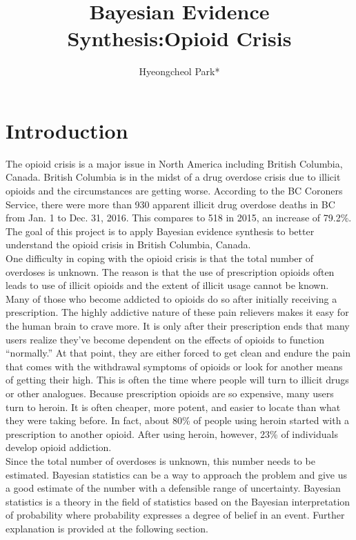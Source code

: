 \documentclass[12pt]{article}
\title{Bayesian Evidence Synthesis:Opioid Crisis}
\author{Hyeongcheol Park*}
\begin{document}
 \maketitle{}
\tableofcontents %
\listoffigures %
\listoftables %
\doublespacing

\section{Introduction}
The opioid crisis is a major issue in North America including British Columbia, Canada. British Columbia is in the midst of a drug overdose crisis due to illicit opioids and the circumstances are getting worse. According to the BC Coroners Service, there were more than 930 apparent illicit drug overdose deaths in BC from Jan. 1 to Dec. 31, 2016. This compares to 518 in 2015, an increase of 79.2\%. \cite{bccdc_opioid}  The goal of this project is to apply Bayesian evidence synthesis to better understand the opioid crisis in British Columbia, Canada.  \\ 

One difficulty in coping with the opioid crisis is that the total number of overdoses is unknown. The reason is that the use of prescription opioids often leads to use of illicit opioids and the extent of illicit usage cannot be known. Many of those who become addicted to opioids do so after initially receiving a prescription. The highly addictive nature of these pain relievers makes it easy for the human brain to crave more. It is only after their prescription ends that many users realize they’ve become dependent on the effects of opioids  to function “normally.” At that point, they are either forced to get clean and endure the pain that comes with the withdrawal symptoms of opioids or look for another means of getting their high. This is often the time where people will turn to illicit drugs or other analogues. Because prescription opioids are so expensive,  many users turn to heroin. It is often cheaper, more potent, and easier to locate than what they were taking before. In fact, about 80\% of people using heroin started with a prescription to another opioid. After using heroin, however, 23\% of individuals develop opioid addiction.\cite{opioid_desc} \\

Since the total number of overdoses is unknown, this number needs to be estimated. Bayesian statistics can be a way to approach the problem and give us a good estimate of the number with a defensible range of uncertainty. Bayesian statistics is a theory in the field of statistics based on the Bayesian interpretation of probability where probability expresses a degree of belief in an event. \cite{wiki_bayes} Further explanation is provided at the following section.\\
\end{document}
